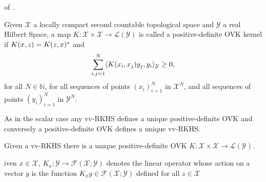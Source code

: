 \documentclass[twoside,11pt]{article}
\begin{document}
of~\citet{Carmeli2010}.
\begin{definition}
    \label{def:reproducing_kernel_real} Given $\mathcal{X}$ a locally compact
    second countable topological space and $\mathcal{Y}$ a real Hilbert Space,
    a map $K:\mathcal{X}\times\mathcal{X}\to\mathcal{L}(\mathcal{Y})$ is called
    a positive-definite \acl{OVK} kernel if $K(x,z)=K(z,x)^*$ and
    \begin{dmath}
        \sum_{i,j=1}^N\inner{K(x_i,x_j)y_j,y_i}_{\mathcal{Y}}\ge 0,
    \end{dmath}
    for all $N\in\mathbb{N}$, for all sequences of points $(x_i)_{i=1}^N$ in
    $\mathcal{X}^N$, and all sequences of points  $(y_i)_{i=1}^N$ in
    $\mathcal{Y}^N$. \label{def:ovk_real}
\end{definition}
As in the scalar case any \acl{vv-RKHS} defines a unique positive-definite
\acl{OVK} and conversely a positive-definite \acl{OVK} defines a unique
\acl{vv-RKHS}.
\begin{proposition}
    \label{pr:unique_rkhs} Given a \acl{vv-RKHS} there is a unique
    positive-definite \acl{OVK}
    $K:\mathcal{X}\times\mathcal{X}\to\mathcal{L}(\mathcal{Y})$.
\end{proposition}
iven $x\in\mathcal{X}$,
$K_x:\mathcal{Y}\to\mathcal{F}(\mathcal{X};\mathcal{Y})$ denotes the linear
operator whose action on a vector $y$ is the function
$K_xy\in\mathcal{F}(\mathcal{X};\mathcal{Y})$ defined for all $z\in\mathcal{X}$
\end{document}
